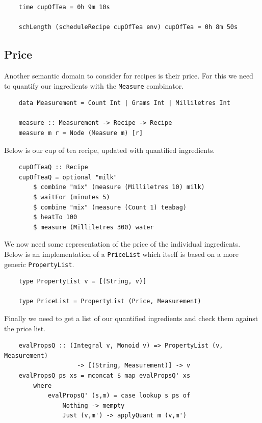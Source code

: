 \documentclass[11pt]{article}
\begin{document}
\begin{lstlisting}
    time cupOfTea = 0h 9m 10s

    schLength (scheduleRecipe cupOfTea env) cupOfTea = 0h 8m 50s
\end{lstlisting}

\subsection{Price}

Another semantic domain to consider for recipes is their price. For this we
need to quantify our ingredients with the \texttt{Measure} combinator.

\begin{lstlisting}
    data Measurement = Count Int | Grams Int | Milliletres Int

    measure :: Measurement -> Recipe -> Recipe
    measure m r = Node (Measure m) [r]
\end{lstlisting}

Below is our cup of tea recipe, updated with quantified ingredients.

\begin{lstlisting}
    cupOfTeaQ :: Recipe
    cupOfTeaQ = optional "milk"
        $ combine "mix" (measure (Milliletres 10) milk)
        $ waitFor (minutes 5)
        $ combine "mix" (measure (Count 1) teabag)
        $ heatTo 100
        $ measure (Milliletres 300) water
\end{lstlisting}

We now need some representation of the price of the individual ingredients.
Below is an implementation of a \texttt{PriceList} which itself is based on
a more generic \texttt{PropertyList}.

\begin{lstlisting}
    type PropertyList v = [(String, v)]

    type PriceList = PropertyList (Price, Measurement)
\end{lstlisting}

Finally we need to get a list of our quantified ingredients and check them
against the price list.

\begin{lstlisting}
    evalPropsQ :: (Integral v, Monoid v) => PropertyList (v, Measurement)
                    -> [(String, Measurement)] -> v
    evalPropsQ ps xs = mconcat $ map evalPropsQ' xs
        where
            evalPropsQ' (s,m) = case lookup s ps of
                Nothing -> mempty
                Just (v,m') -> applyQuant m (v,m')
\end{lstlisting}
\end{document}
